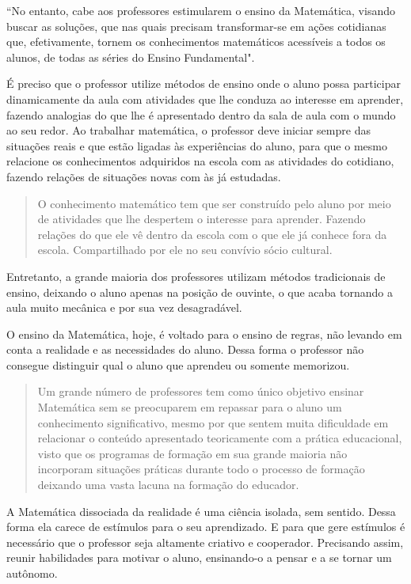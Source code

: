 \documentclass[12pt,a4paper]{article}
\begin{document}
``No entanto, cabe aos professores estimularem o ensino da Matemática, visando buscar as soluções, que nas quais precisam transformar-se em ações cotidianas que, efetivamente, tornem os conhecimentos matemáticos acessíveis a todos os alunos, de todas as séries do Ensino Fundamental". \citep{henrique2004}

É preciso que o professor utilize métodos de ensino onde o aluno possa participar dinamicamente da aula com atividades que lhe conduza ao interesse em aprender, fazendo analogias do que lhe é apresentado dentro da sala de aula com o mundo ao seu redor.
Ao trabalhar matemática, o professor deve iniciar sempre das situações reais e que estão ligadas às experiências do aluno, para que o mesmo relacione os conhecimentos adquiridos na escola com as atividades do cotidiano, fazendo relações de situações novas com às já estudadas.\citep{henrique2004}

\begin{quote}
O conhecimento matemático tem que ser construído pelo aluno por meio de atividades que lhe despertem o interesse para aprender. Fazendo relações do que ele vê dentro da escola com o que ele já conhece fora da escola. Compartilhado por ele no seu convívio sócio cultural. \citep{santos2008ensino} 
\end{quote}

Entretanto, a grande maioria dos professores utilizam métodos tradicionais de ensino, deixando o aluno apenas na posição de ouvinte, o que acaba tornando a aula muito mecânica e por sua vez desagradável.

O ensino da Matemática, hoje, é voltado para o ensino de regras, não levando em conta a realidade e as necessidades do aluno. Dessa forma o professor não consegue distinguir qual o aluno que aprendeu ou somente memorizou. \citep{henrique2004}

\begin{quote}
Um grande número de professores tem como único objetivo ensinar Matemática sem se preocuparem em repassar para o aluno um conhecimento significativo, mesmo por que sentem muita dificuldade em relacionar o conteúdo apresentado teoricamente com a prática educacional, visto que os programas de formação em sua grande maioria não incorporam situações práticas durante todo o processo de formação deixando uma vasta lacuna na formação do educador. %
\end{quote}

A Matemática dissociada da realidade é uma ciência isolada, sem sentido. Dessa forma ela carece de estímulos para o seu aprendizado. E para que gere estímulos é necessário que o professor seja altamente criativo e cooperador. Precisando assim, reunir habilidades para motivar o aluno, ensinando-o a pensar e a se tornar um autônomo. \citep{silva2005refletindo}
\end{document}
